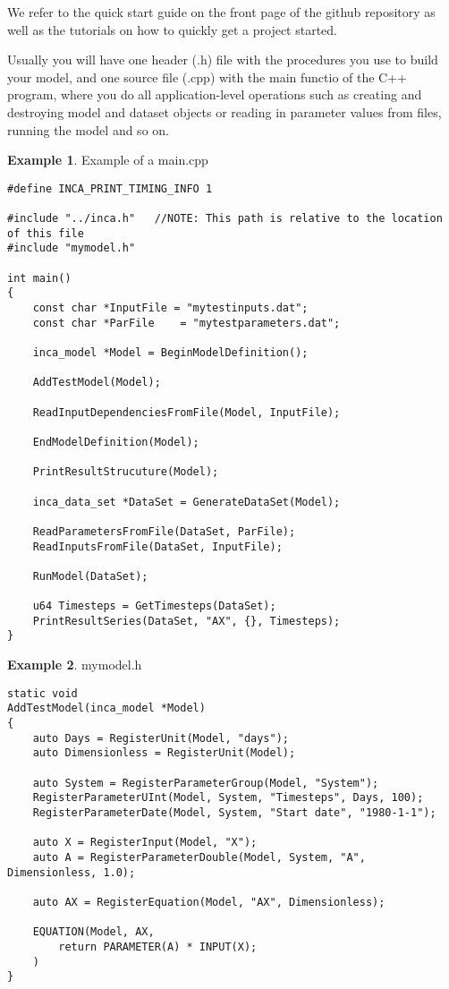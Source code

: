 \documentclass[11pt]{article}
\theoremstyle{definition}
\newtheorem{myexample}{Example}
\newenvironment{example}%
  {\begin{lrbox}{\examplebox}%
   \begin{minipage}{\dimexpr\linewidth-2\fboxsep}
   \begin{myexample}}%
  {\end{myexample}%
   \end{minipage}%
   \end{lrbox}%
   \begin{trivlist}
     \item[]\colorbox{silver}{\usebox\examplebox}
   \end{trivlist}}
\begin{document}
We refer to the quick start guide on the front page of the github repository as well as the tutorials on how to quickly get a project started.

Usually you will have one header (.h) file with the procedures you use to build your model, and one source file (.cpp) with the main functio of the C++ program, where you do all application-level operations such as creating and destroying model and dataset objects or reading in parameter values from files, running the model and so on.

\begin{example}\label{ex:examplemain}
Example of a main.cpp
\begin{lstlisting}[style=mycpp]
#define INCA_PRINT_TIMING_INFO 1

#include "../inca.h"   //NOTE: This path is relative to the location of this file
#include "mymodel.h"

int main()
{
	const char *InputFile = "mytestinputs.dat";
	const char *ParFile    = "mytestparameters.dat";

	inca_model *Model = BeginModelDefinition();
	
	AddTestModel(Model);
	
	ReadInputDependenciesFromFile(Model, InputFile);

	EndModelDefinition(Model);

	PrintResultStrucuture(Model);

	inca_data_set *DataSet = GenerateDataSet(Model);

	ReadParametersFromFile(DataSet, ParFile);
	ReadInputsFromFile(DataSet, InputFile);

	RunModel(DataSet);

	u64 Timesteps = GetTimesteps(DataSet);
	PrintResultSeries(DataSet, "AX", {}, Timesteps);
}

\end{lstlisting}
\end{example}

\begin{example}
mymodel.h
\begin{lstlisting}[style=mycpp]
static void
AddTestModel(inca_model *Model)
{
	auto Days = RegisterUnit(Model, "days");
	auto Dimensionless = RegisterUnit(Model);

	auto System = RegisterParameterGroup(Model, "System");
	RegisterParameterUInt(Model, System, "Timesteps", Days, 100);
	RegisterParameterDate(Model, System, "Start date", "1980-1-1");

	auto X = RegisterInput(Model, "X");
	auto A = RegisterParameterDouble(Model, System, "A", Dimensionless, 1.0);

	auto AX = RegisterEquation(Model, "AX", Dimensionless);

	EQUATION(Model, AX,
		return PARAMETER(A) * INPUT(X);
	)
}
\end{lstlisting}
\end{example}
\end{document}
